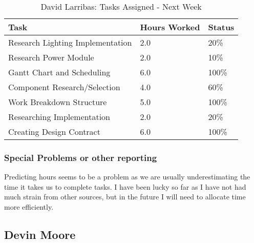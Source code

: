 \documentclass[12pt,article,compsoc]{IEEEtran}
\begin{document}
	\begin{table}[ht]
	\renewcommand{\arraystretch}{1.3}
		\caption{David Larribas: Tasks Assigned - Next Week}
		
		\label{Summary of David Larribas' activites: this week}
		
		\centering
		\begin{tabular}{p{5.5cm}|p{1cm}|p{1cm}}
		\hline

		\bfseries 	Task		 	                            & \bfseries Hours Worked	& \bfseries Status	\\
		\hline\hline
					Research Lighting Implementation			& 2.0						& 20\%				\\
                    Research Power Module                       & 2.0                       & 10\%              \\
					Gantt Chart and Scheduling      	    	& 6.0						& 100\%				\\
					Component Research/Selection		    	& 4.0						& 60\%				\\	
					Work Breakdown Structure                    & 5.0                       & 100\%             \\
                    Researching Implementation				    & 2.0						& 20\%				\\					
					Creating Design Contract				    & 6.0						& 100\%				\\
                    
                    \hline
		\end{tabular}
	\end{table}

	\subsubsection*{Special Problems or other reporting}
    Predicting hours seems to be a problem as we are usually underestimating the time it takes us to complete tasks. I have been lucky so far as I have not had much strain from other sources, but in the future I will need to allocate time more efficiently.
     
	

\subsection{Devin Moore}
\end{document}
